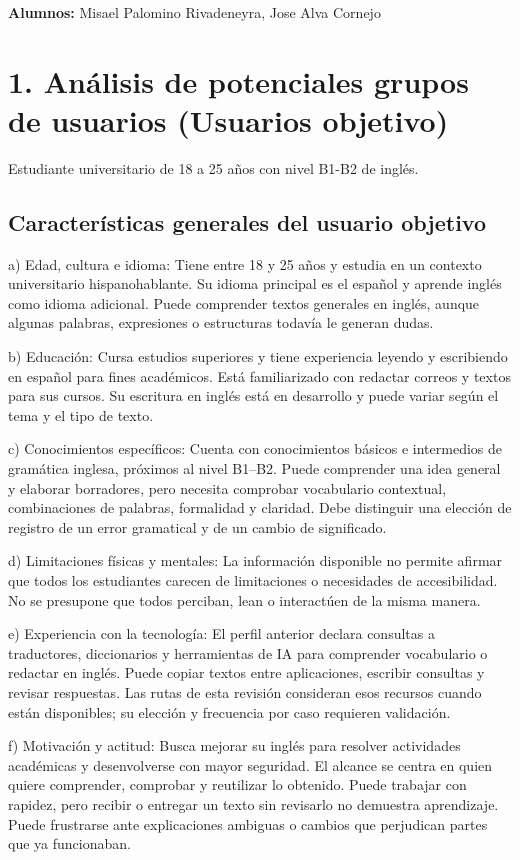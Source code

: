\documentclass[10pt,a4paper]{article}
\begin{document}
\textbf{Alumnos:} Misael Palomino Rivadeneyra, Jose Alva Cornejo\par
\section*{1. Análisis de potenciales grupos de usuarios (Usuarios objetivo)}
Estudiante universitario de 18 a 25 años con nivel B1-B2 de inglés.\par
\subsection*{Características generales del usuario objetivo}
a) Edad, cultura e idioma: Tiene entre 18 y 25 años y estudia en un contexto universitario hispanohablante. Su idioma principal es el español y aprende inglés como idioma adicional. Puede comprender textos generales en inglés, aunque algunas palabras, expresiones o estructuras todavía le generan dudas.\par
b) Educación: Cursa estudios superiores y tiene experiencia leyendo y escribiendo en español para fines académicos. Está familiarizado con redactar correos y textos para sus cursos. Su escritura en inglés está en desarrollo y puede variar según el tema y el tipo de texto.\par
c) Conocimientos específicos: Cuenta con conocimientos básicos e intermedios de gramática inglesa, próximos al nivel B1--B2. Puede comprender una idea general y elaborar borradores, pero necesita comprobar vocabulario contextual, combinaciones de palabras, formalidad y claridad. Debe distinguir una elección de registro de un error gramatical y de un cambio de significado.\par
d) Limitaciones físicas y mentales: La información disponible no permite afirmar que todos los estudiantes carecen de limitaciones o necesidades de accesibilidad. No se presupone que todos perciban, lean o interactúen de la misma manera.\par
e) Experiencia con la tecnología: El perfil anterior declara consultas a traductores, diccionarios y herramientas de IA para comprender vocabulario o redactar en inglés. Puede copiar textos entre aplicaciones, escribir consultas y revisar respuestas. Las rutas de esta revisión consideran esos recursos cuando están disponibles; su elección y frecuencia por caso requieren validación.\par
f) Motivación y actitud: Busca mejorar su inglés para resolver actividades académicas y desenvolverse con mayor seguridad. El alcance se centra en quien quiere comprender, comprobar y reutilizar lo obtenido. Puede trabajar con rapidez, pero recibir o entregar un texto sin revisarlo no demuestra aprendizaje. Puede frustrarse ante explicaciones ambiguas o cambios que perjudican partes que ya funcionaban.\par
\end{document}
